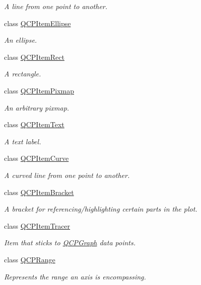 \begin{DoxyCompactItemize}
\begin{DoxyCompactList}\small\item\em A line from one point to another. \end{DoxyCompactList}\item 
class \hyperlink{a00035}{Q\+C\+P\+Item\+Ellipse}
\begin{DoxyCompactList}\small\item\em An ellipse. \end{DoxyCompactList}\item 
class \hyperlink{a00039}{Q\+C\+P\+Item\+Rect}
\begin{DoxyCompactList}\small\item\em A rectangle. \end{DoxyCompactList}\item 
class \hyperlink{a00037}{Q\+C\+P\+Item\+Pixmap}
\begin{DoxyCompactList}\small\item\em An arbitrary pixmap. \end{DoxyCompactList}\item 
class \hyperlink{a00041}{Q\+C\+P\+Item\+Text}
\begin{DoxyCompactList}\small\item\em A text label. \end{DoxyCompactList}\item 
class \hyperlink{a00034}{Q\+C\+P\+Item\+Curve}
\begin{DoxyCompactList}\small\item\em A curved line from one point to another. \end{DoxyCompactList}\item 
class \hyperlink{a00033}{Q\+C\+P\+Item\+Bracket}
\begin{DoxyCompactList}\small\item\em A bracket for referencing/highlighting certain parts in the plot. \end{DoxyCompactList}\item 
class \hyperlink{a00042}{Q\+C\+P\+Item\+Tracer}
\begin{DoxyCompactList}\small\item\em Item that sticks to \hyperlink{a00031}{Q\+C\+P\+Graph} data points. \end{DoxyCompactList}\item 
class \hyperlink{a00049}{Q\+C\+P\+Range}
\begin{DoxyCompactList}\small\item\em Represents the range an axis is encompassing. \end{DoxyCompactList}\item 

\end{DoxyCompactItemize}
